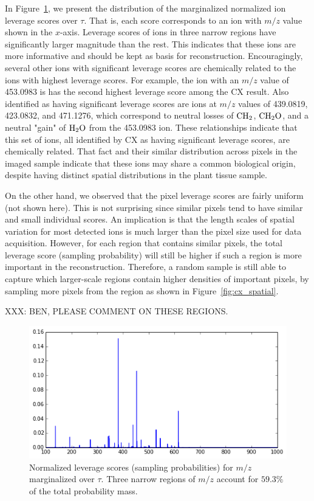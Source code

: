   In Figure~\ref{fig:cx_ions}, we present the distribution of the marginalized normalized ion leverage scores over $\tau$. That is, each score corresponds to an ion with $m/z$ value shown in the $x$-axis. Leverage scores of ions in three narrow regions have significantly larger magnitude than the rest. This indicates that these ions are more informative and should be kept as basis for reconstruction.  Encouragingly, several other ions with significant leverage scores are chemically related to the ions with highest leverage scores.  For example, the ion with an $m/z$ value of 453.0983 is has the second highest leverage score among the CX result.  Also identified as having significant leverage scores are ions at $m/z$ values of 439.0819, 423.0832, and 471.1276, which correspond to neutral losses of $\rm{CH_2}$, $\rm{CH_2O}$, and a neutral "gain" of $\rm{H_2O}$ from the 453.0983 ion.  These relationships indicate that this set of ions, all identified by CX as having significant leverage scores, are chemically related.  That fact and their similar distribution across pixels in the imaged sample indicate that these ions may share a common biological origin, despite having distinct spatial distributions in the plant tissue sample.

  On the other hand, we observed that the pixel leverage scores are fairly uniform (not shown here). This is not surprising since similar pixels tend to have similar and small individual scores.  An implication is that the length scales of spatial variation for most detected ions is much larger than the pixel size used for data acquisition.   However, for each region that contains similar pixels, the total leverage score (sampling probability) will still be higher if such a region is more important in the reconstruction. Therefore, a random sample is still able to capture which larger-scale regions contain higher densities of important pixels, by sampling more pixels from the region as shown in Figure~\ref{fig:cx_spatial}.
  
  {\color{red} XXX: BEN, PLEASE COMMENT ON THESE REGIONS. }
    
    \begin{figure} [h!btp]
    \begin{centering}
    \includegraphics[width=\linewidth]{images/cx_ions.png}
    \end{centering}
    \caption{Normalized leverage scores (sampling probabilities) for $m/z$ marginalized over $\tau$.
      Three narrow regions of $m/z$ account for $59.3\%$ of the total probability mass.}
    \label{fig:cx_ions}
    \end{figure} 
    
